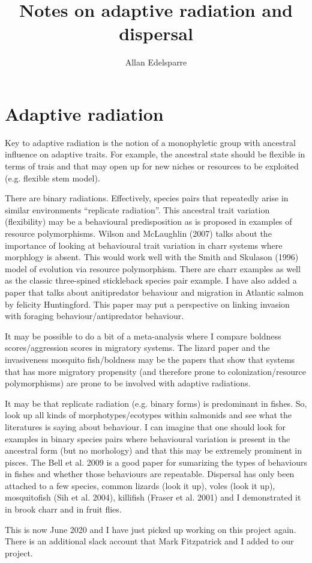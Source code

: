 \documentclass[11pt]{article}
\title{\textbf{Notes on adaptive radiation and dispersal}}
\author{Allan Edelsparre}
\date{}
\begin{document}
\maketitle

\section{Adaptive radiation}

Key to adaptive radiation is the notion of a monophyletic group with ancestral influence on adaptive traits. For example, the ancestral state should be flexible in terms of trais and that may open up for new niches or resources to be exploited (e.g. flexible stem model).

There are binary radiations. Effectively, species pairs that repeatedly arise in similar environments ``replicate radiation''. This ancestral trait variation (flexibility) may be a behavioural predisposition as is proposed in examples of resource polymorphisms. Wilson and McLaughlin (2007) talks about the importance of looking at behavioural trait variation in charr systems where morphlogy is absent. This would work well with the Smith and Skulason (1996) model of evolution via resource polymorphism. There are charr examples as well as the classic three-spined stickleback species pair example. I have also added a paper that talks about anitipredator behaviour and migration in Atlantic salmon by felicity Huntingford. This paper may put a perspective on linking invasion with foraging behaviour/antipredator behaviour. 

It may be possible to do a bit of a meta-analysis where I compare boldness scores/aggression scores in migratory systems. The lizard paper and the invasiveness mosquito fish/boldness may be the papers that show that systems that has more migratory propensity (and therefore prone to colonization/resource polymorphisms) are prone to be involved with adaptive radiations.

It may be that replicate radiation (e.g. binary forms) is predominant in fishes. So, look up all kinds of morphotypes/ecotypes within salmonids and see what the literatures is saying about behaviour. I can imagine that one should look for examples in binary species pairs where behavioural variation is present in the ancestral form (but no morhology) and that this may be extremely prominent in pisces. The Bell et al. 2009 is a good paper for sumarizing the types of behaviours in fishes and whether those behaviours are repeatable. Dispersal has only been attached to a few species, common lizards (look it up), voles (look it up), mosquitofish (Sih et al. 2004), killifish (Fraser et al. 2001) and I demonstrated it in brook charr and in fruit flies.

This is now June 2020 and I have just picked up working on this project again. There is an additional slack account that Mark Fitzpatrick and I added to our project.
\end{document}
